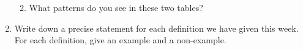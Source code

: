 \documentclass[11pt]{article}
\begin{document}
\begin{enumerate}
\begin{enumerate}
\vspace*{.2in}

\item What patterns do you see in these two tables?

\end{enumerate}

\item Write down a precise statement for each definition we have given this week.
For each definition, give an example and a non-example.

\end{enumerate}
\end{document}
